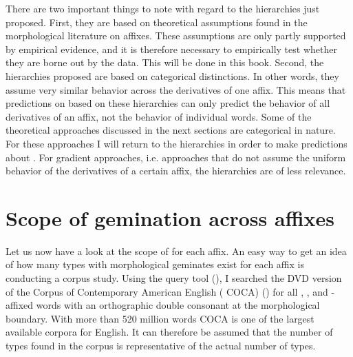 There are two important things to note with regard to the hierarchies just proposed. First, they are  based on  theoretical assumptions found in the morphological literature on affixes. These assumptions are only partly supported by empirical evidence, and it is therefore necessary to empirically test whether they are borne out by the data. This will be done in this book.
Second, the hierarchies proposed are based on categorical distinctions. In other words, they assume very similar behavior across the derivatives of one affix. This means that predictions on  based on these hierarchies can only predict the behavior of all derivatives of an affix, not the behavior of individual words. Some of the theoretical approaches discussed in the next sections are categorical in nature. For these approaches I will return to the  hierarchies in order to make predictions about . For gradient approaches, i.e. approaches that  do not assume the uniform behavior of the derivatives of a certain affix,  the  hierarchies are of less relevance.


\section{Scope of gemination across affixes} \label{scope of gemination}

Let us now have a look at the scope of  for each affix. An easy way to get an idea of how many types with morphological {geminates} exist for each affix is conducting a corpus study. Using the query tool  (\citealt{Kunter.2016}), I searched the DVD version of the {Corpus of Contemporary American English ( {COCA})} (\citealt{Davies.20082014}) for all , ,  and -affixed words with an orthographic double consonant at the morphological boundary. With more than 520 million words  {COCA} is one of the largest available corpora for English. It can therefore be assumed that the number of types found in the corpus is representative of the actual number of types.


